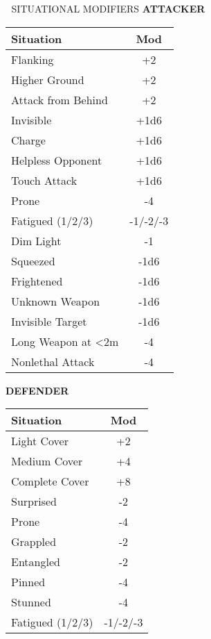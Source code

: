 \documentclass[10pt,a4paper,landscape]{article}
\begin{document}
\begin{multicols}{4}
		\begin{mainsection}{🎲 SITUATIONAL MODIFIERS}
			\textbf{ATTACKER}
			\begin{tabular}{@{}p{3.5cm}c@{}}
				\toprule
				\textbf{Situation} & \textbf{Mod} \\
				\midrule
				Flanking & +2 \\
				Higher Ground & +2 \\
				Attack from Behind & +2 \\
				Invisible & +1d6 \\
				Charge & +1d6 \\
				Helpless Opponent & +1d6 \\
				Touch Attack & +1d6 \\
				\midrule
				Prone & -4 \\
				Fatigued (1/2/3) & -1/-2/-3 \\
				Dim Light & -1 \\
				Squeezed & -1d6 \\
				Frightened & -1d6 \\
				Unknown Weapon & -1d6 \\
				Invisible Target & -1d6 \\
				Long Weapon at <2m & -4 \\
				Nonlethal Attack & -4 \\
				\bottomrule
			\end{tabular}

			\vspace{2mm}

			\textbf{DEFENDER}
			\begin{tabular}{@{}p{3.5cm}c@{}}
				\toprule
				\textbf{Situation} & \textbf{Mod} \\
				\midrule
				Light Cover & +2 \\
				Medium Cover & +4 \\
				Complete Cover & +8 \\
				\midrule
				Surprised & -2 \\
				Prone & -4 \\
				Grappled & -2 \\
				Entangled & -2 \\
				Pinned & -4 \\
				Stunned & -4 \\
				Fatigued (1/2/3) & -1/-2/-3 \\
				\bottomrule
			\end{tabular}
		\end{mainsection}


\end{multicols}
\end{document}

